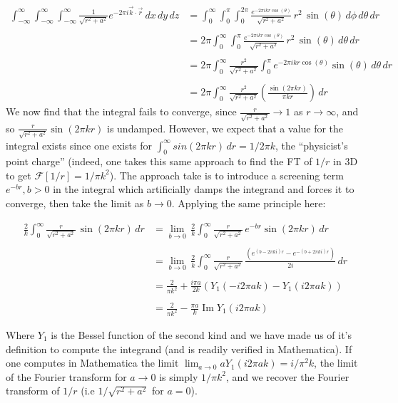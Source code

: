 \documentclass[letterpaper,10pt]{article}
\begin{document}
\begin{align*}
\int_{-\infty}^\infty\int_{-\infty}^\infty\int_{-\infty}^\infty \frac{1}{\sqrt{r^2+a^2}}e^{-2 \pi i\vec k\cdot \vec r }\,dx\,dy\,dz&=
\int_0^\infty\int_0^\pi \int_0^{2\pi} \frac{e^{-2 \pi ikr\cos(\theta)}}{\sqrt{r^2+a^2}}\,r^2\,\sin(\theta)\,d\phi\,d\theta\,dr\\\\
&=2\pi \int_0^\infty \int_0^\pi \frac{e^{-2 \pi ikr\cos(\theta)}}{\sqrt{r^2+a^2}}\,r^2\,\sin(\theta)\,d\theta\,dr\\\\
&=2\pi \int_0^\infty \frac{r^2}{\sqrt{r^2+a^2}} \int_0^\pi  e^{-2 \pi ikr\cos(\theta)}\sin(\theta)\,d\theta\,dr\,\\\\
&=2\pi \int_0^\infty \frac{r^2}{\sqrt{r^2+a^2}}\left(\frac{\sin(2\pi kr)}{\pi k r}\right)\,dr
\end{align*}
We now find that the integral fails to converge, since $\frac{r}{\sqrt{r^2+a^2}} \to 1$ as $r \to \infty$, and so $\frac{r}{\sqrt{r^2+a^2}} \sin(2\pi kr)$ is undamped. However, we expect that a value for the integral exists since one exists for $\int_0^\infty sin(2 \pi kr) \,dr = 1/2 \pi k $, the ``physicist's point charge'' (indeed, one takes this same approach to find the FT of $1/r$ in 3D to get $\mathcal{F}[1/r] = 1/\pi k^2$). The approach take is to introduce a screening term $e^{-br}, b>0$ in the integral which artificially damps the integrand and forces it to converge, then take the limit as $b\rightarrow 0$. Applying the same principle here:

\begin{align*}
\frac{2}{k} \int_0^\infty \frac{r}{\sqrt{r^2+a^2}}\,\sin(2\pi kr)\,dr &= \lim_{b \to 0}\, \frac{2}{k} \int_0^\infty \frac{r}{\sqrt{r^2+a^2}}\,e^{-b r}\sin(2\pi kr)\,dr\\\\
&= \lim_{b \to 0}\, \frac{2}{k} \int_0^\infty \frac{r}{\sqrt{r^2+a^2}}\, \frac{( e^{(b - 2 \pi k i)r} - e^{-(b + 2 \pi k i)r})}{2 i}\, dr\\\\
&= \frac{2}{\pi k^2} + \frac{i \pi a}{2k} (Y_1(-i 2 \pi a k)-Y_1(i 2 \pi a k))\\\\
&= \frac{2}{\pi k^2} - \frac{\pi a}{k} \operatorname{Im}Y_1(i 2 \pi a k)
\end{align*}

Where $Y_1$ is the Bessel function of the second kind and we have made us of it's definition to compute the integrand (and is readily verified in Mathematica).
If one computes in Mathematica the limit $\lim_{a \to 0} a Y_1(i 2 \pi a k) = i/\pi^2 k$, the limit of the Fourier transform for $a \to 0$ is simply $1/\pi k^2$, and we recover the Fourier transform of $1/r$ (i.e $1/\sqrt{r^2 + a^2}$ for $a=0$).
\end{document}
